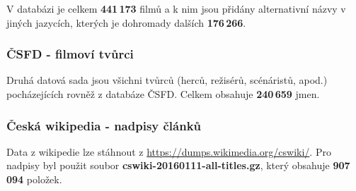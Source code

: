 \documentclass[12pt,letterpaper,oneside,openright]{book}
\begin{document}
V databázi je celkem \textbf{441\,173} filmů a k nim jsou přidány
alternativní názvy v jiných jazycích, kterých je dohromady dalších
\textbf{176\,266}.

\subsubsection{ČSFD - filmoví tvůrci}
Druhá datová sada jsou všichni tvůrců (herců, režisérů, scénáristů,
apod.) pocházejících rovněž z databáze ČSFD. Celkem obsahuje
\textbf{240\,659} jmen.

\subsubsection{Česká wikipedia - nadpisy článků}
Data z wikipedie lze stáhnout z \url{https://dumps.wikimedia.org/cswiki/}. Pro
nadpisy byl použit soubor \textbf{cswiki-20160111-all-titles.gz}, který
obsahuje \textbf{907\,094} položek.

%
\end{document}
